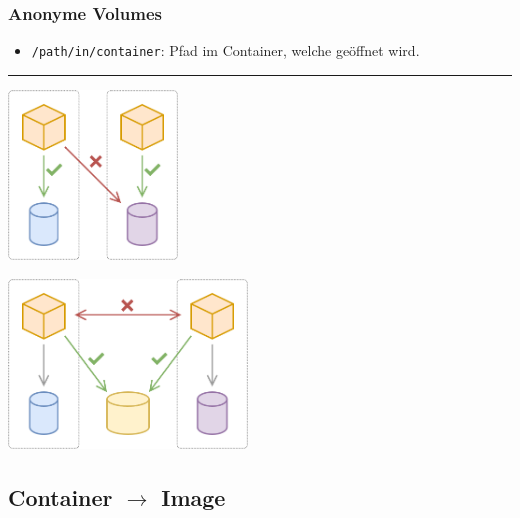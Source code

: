 \documentclass[
  10pt,
  a4paper,
  twocolumn]{article}
\newenvironment{Shaded}{}{}
\newcommand{\AttributeTok}[1]{\textcolor[rgb]{0.84,0.23,0.29}{#1}}
\newcommand{\ExtensionTok}[1]{\textcolor[rgb]{0.84,0.23,0.29}{\textbf{#1}}}
\newcommand{\NormalTok}[1]{\textcolor[rgb]{0.14,0.16,0.18}{#1}}
\providecommand{\tightlist}{%
  \setlength{\itemsep}{0pt}\setlength{\parskip}{0pt}}\usepackage{longtable,booktabs,array}
\begin{document}
\subsubsection{Anonyme Volumes}\label{anonyme-volumes}

\begin{Shaded}
\end{Shaded}

\begin{itemize}
\tightlist
\item
  \texttt{/path/in/container}: Pfad im Container, welche geöffnet wird.
\end{itemize}

\begin{center}\rule{0.5\linewidth}{0.5pt}\end{center}

\begin{center}
\includegraphics[width=\textwidth,height=4.5cm]{images/docker/container_local_storage.png}
\end{center}

\begin{center}
\includegraphics[width=\textwidth,height=4.5cm]{images/docker/container_shared_storage.png}
\end{center}

\subsection{\texorpdfstring{Container \(\rightarrow\)
Image}{Container \textbackslash rightarrow Image}}\label{container-rightarrow-image}
\end{document}
